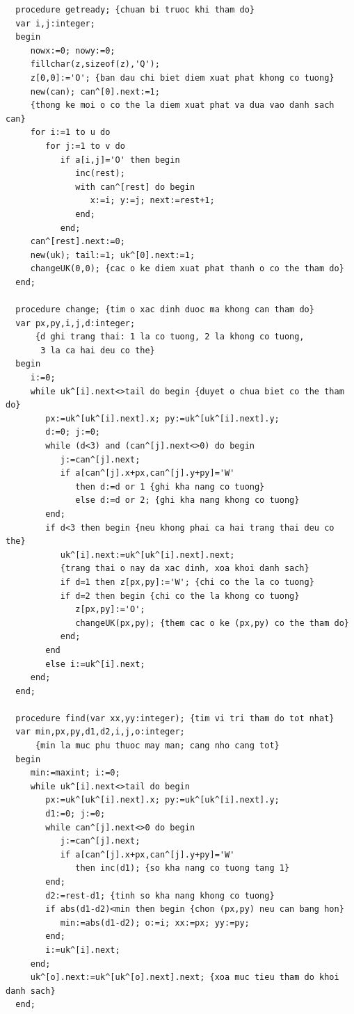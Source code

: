 \documentclass[11pt]{article}
\begin{document}
\begin{verbatim}
  procedure getready; {chuan bi truoc khi tham do}
  var i,j:integer;
  begin
     nowx:=0; nowy:=0;
     fillchar(z,sizeof(z),'Q');
     z[0,0]:='O'; {ban dau chi biet diem xuat phat khong co tuong}
     new(can); can^[0].next:=1;
     {thong ke moi o co the la diem xuat phat va dua vao danh sach can}
     for i:=1 to u do
        for j:=1 to v do
           if a[i,j]='O' then begin
              inc(rest);
              with can^[rest] do begin
                 x:=i; y:=j; next:=rest+1;
              end;
           end;
     can^[rest].next:=0;
     new(uk); tail:=1; uk^[0].next:=1;
     changeUK(0,0); {cac o ke diem xuat phat thanh o co the tham do}
  end;

  procedure change; {tim o xac dinh duoc ma khong can tham do}
  var px,py,i,j,d:integer;
      {d ghi trang thai: 1 la co tuong, 2 la khong co tuong,
       3 la ca hai deu co the}
  begin
     i:=0;
     while uk^[i].next<>tail do begin {duyet o chua biet co the tham do}
        px:=uk^[uk^[i].next].x; py:=uk^[uk^[i].next].y;
        d:=0; j:=0;
        while (d<3) and (can^[j].next<>0) do begin
           j:=can^[j].next;
           if a[can^[j].x+px,can^[j].y+py]='W'
              then d:=d or 1 {ghi kha nang co tuong}
              else d:=d or 2; {ghi kha nang khong co tuong}
        end;
        if d<3 then begin {neu khong phai ca hai trang thai deu co the}
           uk^[i].next:=uk^[uk^[i].next].next;
           {trang thai o nay da xac dinh, xoa khoi danh sach}
           if d=1 then z[px,py]:='W'; {chi co the la co tuong}
           if d=2 then begin {chi co the la khong co tuong}
              z[px,py]:='O';
              changeUK(px,py); {them cac o ke (px,py) co the tham do}
           end;
        end
        else i:=uk^[i].next;
     end;
  end;

  procedure find(var xx,yy:integer); {tim vi tri tham do tot nhat}
  var min,px,py,d1,d2,i,j,o:integer;
      {min la muc phu thuoc may man; cang nho cang tot}
  begin
     min:=maxint; i:=0;
     while uk^[i].next<>tail do begin
        px:=uk^[uk^[i].next].x; py:=uk^[uk^[i].next].y;
        d1:=0; j:=0;
        while can^[j].next<>0 do begin
           j:=can^[j].next;
           if a[can^[j].x+px,can^[j].y+py]='W'
              then inc(d1); {so kha nang co tuong tang 1}
        end;
        d2:=rest-d1; {tinh so kha nang khong co tuong}
        if abs(d1-d2)<min then begin {chon (px,py) neu can bang hon}
           min:=abs(d1-d2); o:=i; xx:=px; yy:=py;
        end;
        i:=uk^[i].next;
     end;
     uk^[o].next:=uk^[uk^[o].next].next; {xoa muc tieu tham do khoi danh sach}
  end;


\end{verbatim}
\end{document}

